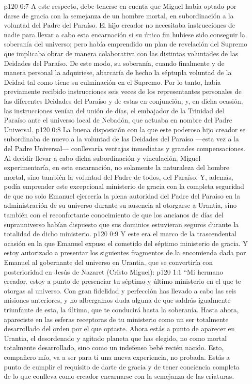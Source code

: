 \vs p120 0:7 \pc A este respecto, debe tenerse en cuenta que Miguel había optado por darse de gracia con la semejanza de un hombre mortal, en subordinación a la voluntad del Padre del Paraíso. El hijo creador no necesitaba instrucciones de nadie para llevar a cabo esta encarnación si su único fin hubiese sido conseguir la soberanía del universo; pero había emprendido un plan de revelación del Supremo que implicaba obrar de manera colaborativa con las distintas voluntades de las Deidades del Paraíso. De este modo, su soberanía, cuando finalmente y de manera personal la adquiriese, abarcaría de hecho la séptupla voluntad de la Deidad tal como tiene su culminación en el Supremo. Por lo tanto, había previamente recibido instrucciones seis veces de los representantes personales de las diferentes Deidades del Paraíso y de estas en conjunción; y, en dicha ocasión, las instrucciones venían del unión de días, el embajador de la Trinidad del Paraíso ante el universo local de Nebadón, que actuaba en nombre del Padre Universal.
\vs p120 0:8 \pc La buena disposición con la que este poderoso hijo creador se subordinaba de nuevo a la voluntad de las Deidades del Paraíso ---esta vez a la del Padre Universal--- conllevaría ventajas inmediatas y grandes compensaciones. Al decidir llevar a cabo dicha subordinación y vinculación, Miguel experimentaría, en esta encarnación, no solamente la naturaleza del hombre mortal, sino también la voluntad del Padre de todos, del Paraíso. Y, además, podía emprender este excepcional ministerio de gracia con la completa seguridad de que no solo Emanuel ejercería la plena autoridad del Padre del Paraíso en la administración de su universo durante su ausencia al otorgarse a Urantia, sino también con el reconfortante conocimiento de que los ancianos de días del suprauniverso habían dispuesto que sus dominios estuvieran seguros durante la totalidad de dicho ministerio.
\vs p120 0:9 \pc Y este era el marco de la trascendental ocasión en la que Emanuel expuso el cometido del séptimo ministerio de gracia. Y estoy autorizado a presentar los siguientes fragmentos de la encomienda dada por Emanuel al gobernante del universo en Urantia, que se convertiría con posterioridad en Jesús de Nazaret (Cristo Miguel):
\vs p120 1:1 “Mi hermano creador, estoy a punto de presenciar tu séptimo y último ministerio en el que te otorgas al universo. Con gran fidelidad y perfección has llevado a cabo las seis misiones anteriores, y no albergamos duda alguna de que saldrás igualmente triunfante de esta, la última, que te conducirá hasta la soberanía. Hasta ahora, apareciste en las esferas receptoras de tu ministerio como un ser totalmente desarrollado del orden por el que optaste. Ahora estás a punto de aparecer en Urantia, el desordenado y agitado planeta que has elegido, no como mortal totalmente desarrollado, sino como un indefenso bebé recién nacido. Esto, compañero mío, va a ser para ti una nueva experiencia, no probada. Estás a punto de cumplir el requisito de darte de gracia y de tener conciencia completa de lo que conlleva como creador encarnarse con la semejanza de las criaturas.
